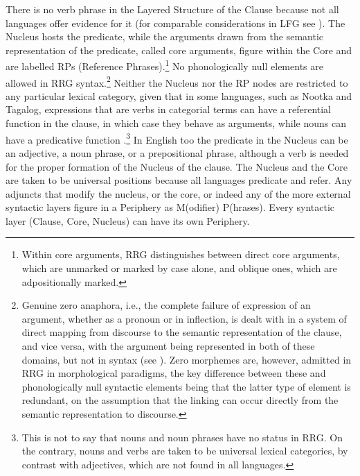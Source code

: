 \documentclass[output=paper,hidelinks]{langscibook}
\begin{document}
  There is no verb phrase in the Layered Structure of the Clause because not all languages offer evidence for it (for comparable considerations in LFG see \citealt[5-6]{BoNoSa19}). The Nucleus hosts the predicate, while the arguments drawn from the semantic representation of the predicate, called core arguments, figure within the Core and are labelled RPs (Reference Phrases).\footnote{\label{fn:RRG:2}Within core arguments, RRG distinguishes between direct core arguments, which are unmarked or marked by case alone, and oblique ones, which are adpositionally marked.} No phonologically null elements are allowed in RRG syntax.\footnote{\label{fn:RRG:3}Genuine zero anaphora, i.e., the complete failure of expression of an argument, whether as a pronoun or in inflection, is dealt with in a system of direct mapping from discourse to the semantic representation of the clause, and vice versa, with the argument being represented in both of these domains, but not in syntax (see ). Zero morphemes are, however, admitted in RRG in morphological paradigms, the key difference between these and phonologically null syntactic elements being that the latter type of element is redundant, on the assumption that the linking can occur directly from the semantic representation to discourse.} Neither the Nucleus nor the RP nodes are restricted to any particular lexical category, given that in some languages, such as Nootka and Tagalog, expressions that are verbs in categorial terms can have a referential function in the clause, in which case they behave as arguments, while nouns can have a predicative function \citep[170]{VanValin2008}.\footnote{This is not to say that nouns and noun phrases have no status in RRG. On the contrary, nouns and verbs are taken to be universal lexical categories, by contrast with adjectives, which are not found in all languages.} In English too the predicate in the Nucleus can be an adjective, a noun phrase, or a prepositional phrase, although a verb is needed for the proper formation of the Nucleus of the clause. The Nucleus and the Core are taken to be universal positions because all languages predicate and refer. Any adjuncts that modify the nucleus, or the core, or indeed any of the more external syntactic layers figure in a Periphery as M(odifier) P(hrases). Every syntactic layer (Clause, Core, Nucleus) can have its own Periphery.
\end{document}
